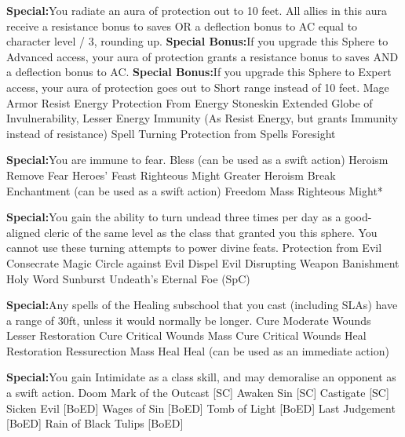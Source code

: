 \textbf{Special:}{You radiate an aura of protection out to 10 feet. All allies in this aura receive a resistance bonus to saves OR a deflection bonus to AC equal to character level / 3, rounding up.}
\textbf{Special Bonus:}{If you upgrade this Sphere to Advanced access, your aura of protection grants a resistance bonus to saves AND a deflection bonus to AC.}
\textbf{Special Bonus:}{If you upgrade this Sphere to Expert access, your aura of protection goes out to Short range instead of 10 feet.}
\sphere
{Mage Armor}
{Resist Energy}
{Protection From Energy}
{Stoneskin}
{Extended Globe of Invulnerability, Lesser}
{Energy Immunity (As Resist Energy, but grants Immunity instead of resistance)}
{Spell Turning}
{Protection from Spells}
{Foresight}

\textbf{Special:}{You are immune to fear.}
\sphere
{Bless (can be used as a swift action)}
{Heroism}
{Remove Fear}
{Heroes' Feast}
{Righteous Might}
{Greater Heroism}
{Break Enchantment (can be used as a swift action)}
{Freedom}
{Mass Righteous Might*}

\textbf{Special:}{You gain the ability to turn undead three times per day as a good-aligned cleric of the same level as the class that granted you this sphere. You cannot use these turning attempts to power divine feats.}
\sphere
{Protection from Evil}
{Consecrate}
{Magic Circle against Evil}
{Dispel Evil}
{Disrupting Weapon}
{Banishment}
{Holy Word}
{Sunburst}
{Undeath's Eternal Foe (SpC)}

\textbf{Special:}{Any spells of the Healing subschool that you cast (including SLAs) have a range of 30ft, unless it would normally be longer.}
\sphere
{Cure Moderate Wounds}
{Lesser Restoration}
{Cure Critical Wounds}
{Mass Cure Critical Wounds}
{Heal}
{Restoration}
{Ressurection}
{Mass Heal}
{Heal (can be used as an immediate action)}

\textbf{Special:}{You gain Intimidate as a class skill, and may demoralise an opponent as a swift action.}
\sphere
{Doom}
{Mark of the Outcast [SC]}
{Awaken Sin [SC]}
{Castigate [SC]}
{Sicken Evil [BoED]}
{Wages of Sin [BoED]}
{Tomb of Light [BoED]}
{Last Judgement [BoED]}
{Rain of Black Tulips [BoED]}

